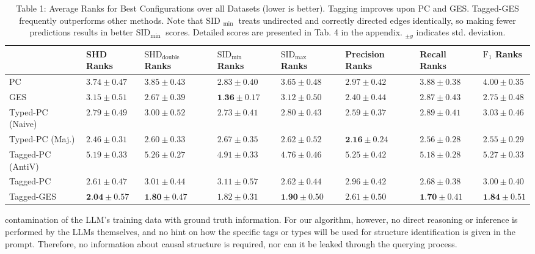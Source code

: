 \documentclass[10pt]{article}
\begin{document}
\begin{table}[h]
\begin{center}
\begin{tabular}{|l|l|l|l|l|l|l|l|}
\hline
 & SHD Ranks & $\mathrm{SHD}_{\text {double }}$ Ranks & $\mathrm{SID}_{\text {min }}$ Ranks & $\mathrm{SID}_{\text {max }}$ Ranks & Precision Ranks & Recall Ranks & $\mathrm{F}_{1}$ Ranks \\
\hline
PC & $3.74 \pm 0.47$ & $3.85 \pm 0.43$ & $2.83 \pm 0.40$ & $3.65 \pm 0.48$ & $2.97 \pm 0.42$ & $3.88 \pm 0.38$ & $4.00 \pm 0.35$ \\
\hline
GES & $3.15 \pm 0.51$ & $2.67 \pm 0.39$ & $\mathbf{1 . 3 6} \pm 0.17$ & $3.12 \pm 0.50$ & $2.40 \pm 0.44$ & $2.87 \pm 0.43$ & $2.75 \pm 0.48$ \\
\hline
Typed-PC (Naive) & $2.79 \pm 0.49$ & $3.00 \pm 0.52$ & $2.73 \pm 0.41$ & $2.80 \pm 0.43$ & $2.59 \pm 0.37$ & $2.89 \pm 0.41$ & $3.03 \pm 0.46$ \\
\hline
Typed-PC (Maj.) & $2.46 \pm 0.31$ & $2.60 \pm 0.33$ & $2.67 \pm 0.35$ & $2.62 \pm 0.52$ & $\mathbf{2 . 1 6} \pm 0.24$ & $2.56 \pm 0.28$ & $2.55 \pm 0.29$ \\
\hline
Tagged-PC (AntiV) & $5.19 \pm 0.33$ & $5.26 \pm 0.27$ & $4.91 \pm 0.33$ & $4.76 \pm 0.46$ & $5.25 \pm 0.42$ & $5.18 \pm 0.28$ & $5.27 \pm 0.33$ \\
\hline
Tagged-PC & $2.61 \pm 0.47$ & $3.01 \pm 0.44$ & $3.11 \pm 0.57$ & $2.62 \pm 0.44$ & $2.96 \pm 0.42$ & $2.68 \pm 0.38$ & $3.00 \pm 0.40$ \\
\hline
Tagged-GES & $\mathbf{2 . 0 4} \pm 0.57$ & $\mathbf{1 . 8 0} \pm 0.47$ & $1.82 \pm 0.31$ & $\mathbf{1 . 9 0} \pm 0.50$ & $2.61 \pm 0.50$ & $\mathbf{1 . 7 0} \pm 0.41$ & $\mathbf{1 . 8 4} \pm 0.51$ \\
\hline
\end{tabular}
\captionsetup{labelformat=empty}
\caption{Table 1: Average Ranks for Best Configurations over all Datasets (lower is better). Tagging improves upon PC and GES. Tagged-GES frequently outperforms other methods. Note that SID ${ }_{\text {min }}$ treats undirected and correctly directed edges identically, so making fewer predictions results in better $\mathrm{SID}_{\text {min }}$ scores. Detailed scores are presented in Tab. 4 in the appendix. ${ }_{ \pm y}$ indicates std. deviation.}
\end{center}
\end{table}

contamination of the LLM's training data with ground truth information. For our algorithm, however, no direct reasoning or inference is performed by the LLMs themselves, and no hint on how the specific tags or types will be used for structure identification is given in the prompt. Therefore, no information about causal structure is required, nor can it be leaked through the querying process.
\end{document}
